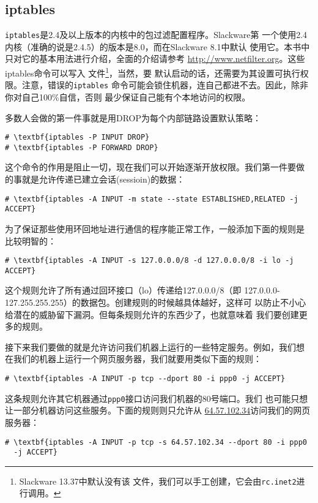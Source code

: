 \subsection{iptables}
\label{chap:security:hostAccessControl:iptables}
\texttt{iptables}是2.4及以上版本的内核中的包过滤配置程序。Slackware第
一个使用2.4内核（准确的说是2.4.5）的版本是8.0，而在Slackware 8.1中默认
使用它。本书中只对它的基本用法进行介绍，全面的介绍请参考
\url{http://www.netfilter.org}。这些iptables命令可以写入
文件\footnote{Slackware 13.37中默认没有该
  文件，我们可以手工创建，它会由\texttt{rc.inet2}进行调用。}，当然，要
默认启动的话，还需要为其设置可执行权限。注意，错误的\texttt{iptables}
命令可能会锁住机器，连自己都进不去。因此，除非你对自己100\%自信，否则
最少保证自己能有个本地访问的权限。

多数人会做的第一件事就是用DROP为每个内部链路设置默认策略：
\begin{Verbatim}[frame=single, commandchars=\\\{\}]
# \textbf{iptables -P INPUT DROP}
# \textbf{iptables -P FORWARD DROP}
\end{Verbatim}
这个命令的作用是阻止一切，现在我们可以开始逐渐开放权限。我们第一件要做
的事就是允许传递已建立会话(sessioin)的数据：
\begin{Verbatim}[frame=single, commandchars=\\\{\}]
# \textbf{iptables -A INPUT -m state --state ESTABLISHED,RELATED -j ACCEPT}
\end{Verbatim}

为了保证那些使用环回地址进行通信的程序能正常工作，一般添加下面的规则是
比较明智的：
\begin{Verbatim}[frame=single, commandchars=\\\{\}]
# \textbf{iptables -A INPUT -s 127.0.0.0/8 -d 127.0.0.0/8 -i lo -j ACCEPT}
\end{Verbatim}

这个规则允许了所有通过回环接口（lo）传递给127.0.0.0/8（即
127.0.0.0-127.255.255.255）的数据包。创建规则的时候越具体越好，这样可
以防止不小心给潜在的威胁留下漏洞。但每条规则允许的东西少了，也就意味着
我们要创建更多的规则。

接下来我们要做的就是允许访问我们机器上运行的一些特定服务。例如，我们想
在我们的机器上运行一个网页服务器，我们就要用类似下面的规则：
\begin{Verbatim}[frame=single, commandchars=\\\{\}]
# \textbf{iptables -A INPUT -p tcp --dport 80 -i ppp0 -j ACCEPT}
\end{Verbatim}
这条规则允许其它机器通过\texttt{ppp0}接口访问我们机器的80号端口。我们
也可能只想让一部分机器访问这些服务。下面的规则则只允许从
\url{64.57.102.34}访问我们的网页服务器：
\begin{Verbatim}[frame=single, commandchars=\\\{\}]
# \textbf{iptables -A INPUT -p tcp -s 64.57.102.34 --dport 80 -i ppp0
  -j ACCEPT}
\end{Verbatim}

